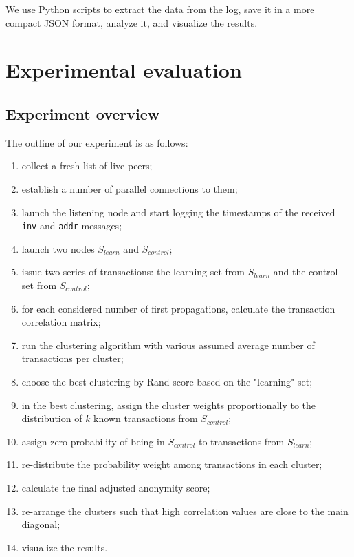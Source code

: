 We use Python scripts to extract the data from the log, save it in a more compact JSON format, analyze it, and visualize the results.

\section{Experimental evaluation}

\subsection{Experiment overview}

The outline of our experiment is as follows:

\begin{enumerate}
	\item collect a fresh list of live peers;
	\item establish a number of parallel connections to them;
	\item launch the listening node and start logging the timestamps of the received \texttt{inv} and \texttt{addr} messages;
	\item launch two nodes $S_{learn}$ and $S_{control}$;%
	\item issue two series of transactions: the learning set from $S_{learn}$ and the control set from $S_{control}$;
	\item for each considered number of first propagations, calculate the transaction correlation matrix;
	\item run the clustering algorithm with various assumed average number of transactions per cluster;
	\item choose the best clustering by Rand score based on the "learning" set;
	\item in the best clustering, assign the cluster weights proportionally to the distribution of $k$ known transactions from $S_{control}$;
	\item assign zero probability of being in $S_{control}$ to transactions from $S_{learn}$;
	\item re-distribute the probability weight among transactions in each cluster;
	\item calculate the final adjusted anonymity score;
	\item re-arrange the clusters such that high correlation values are close to the main diagonal;
	\item visualize the results.
\end{enumerate}

